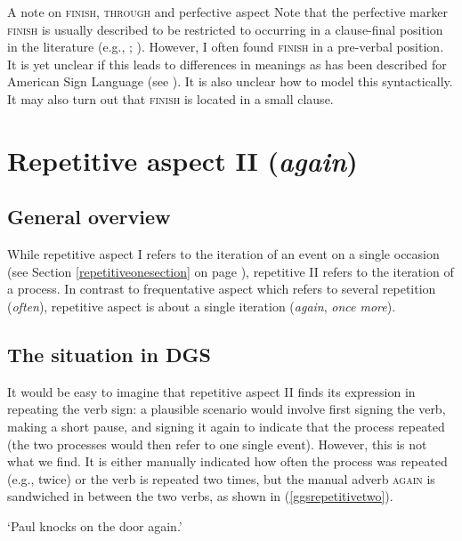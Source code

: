 \begin{digression}{{A note on \textsc{finish}, \textsc{through} and perfective aspect}}{}
\noindent Note that the perfective marker \textsc{finish} is usually described to be restricted to occurring in a clause-final position in the literature (e.g., \citealt[3]{pfau2004grammaticalization}; \citealt[261--262]{rathmann2005event}). However, I often found \textsc{finish} in a pre-verbal position. It is yet unclear if this leads to differences in meanings as has been described for American Sign Language (see \citealt{rathmann2005event}). It is also unclear how to model this syntactically. It may also turn out that \textsc{finish} is located in a small clause.
\end{digression}




\section{Repetitive aspect II (\textit{again})}\label{repetitivetwo}
\subsection{General overview}
While repetitive aspect I refers to the iteration of an event on a single occasion (see Section \ref{repetitiveonesection} on page \pageref{repetitiveonesection}), repetitive II refers to the iteration of a process. In contrast to frequentative aspect which refers to several repetition (\textit{often}), repetitive aspect is about a single iteration (\textit{again}, \textit{once more}).

\subsection{The situation in DGS}
It would be easy to imagine that repetitive aspect II finds its expression in repeating the verb sign: a plausible scenario would involve first signing the verb, making a short pause, and signing it again to indicate that the process repeated (the two processes would  then refer to one single event). However, this is not what we find. It is either manually indicated how often the process was repeated (e.g., twice) or the verb is repeated two times, but the manual adverb \textsc{again} is sandwiched in between the two verbs, as shown in (\ref{ggsrepetitivetwo}).


\begin{exe}
\glt `Paul knocks on the door again.' \label{ggsrepetitivetwo}
\end{exe}

